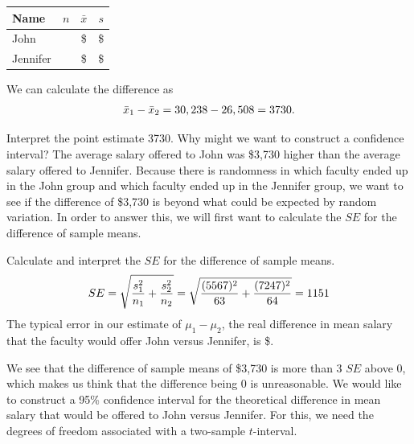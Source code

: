 \begin{center}
\begin{tabular}{l ccc}
\hline
Name\hspace{2mm}	& $n$	& $\bar{x}$	& $s$	\\
\hline 
John		& \johnn{}		& 		 \$\johnmean{} 	& \$\johnsd{}		 \\
Jennifer		& \jennifern{}		& \$\jennifermean{}		& \$\jennifersd{}		 \\
\hline
\end{tabular}
\end{center}
\label{summaryStatsForJohnJenniferStudy}
We can calculate the difference as 
\begin{align*}
 \bar{x}_1-\bar{x}_2 = 30,238{} - 26,508{} = 3730.
\end{align*}

\begin{examplewrap}
\begin{nexample}
{Interpret the point estimate 3730.  Why might we want to construct a confidence interval?}
The average salary offered to John was \$3,730 higher than the average salary offered to Jennifer.  Because there is randomness in which faculty ended up in the John group and which faculty ended up in the Jennifer group, we want to see if the difference of \$3,730 is beyond what could be expected by random variation.  In order to answer this, we will first want to calculate the $SE$ for the difference of sample means.
\end{nexample}
\end{examplewrap}

\begin{examplewrap}
\begin{nexample}
{Calculate and interpret the $SE$ for the difference of sample means.}
\begin{align*}
SE = \sqrt{\frac{s_{1}^2}{n_{1}} + \frac{s_{2}^2}{n_{2}}} = \sqrt{\frac{(5567{})^2}{63{}} + \frac{(7247{})^2}{64{}}} = 1151{}
\end{align*}
The typical error in our estimate of $\mu_1-\mu_2$, the real difference in mean salary that the faculty would offer John versus Jennifer, is \$\johnjenniferSE{}.
\end{nexample}
\end{examplewrap}

\D{\newpage}

We see that the difference of sample means of \$3,730 is more than 3 $SE$ above 0, which makes us think that the difference being 0 is unreasonable.  We would like to construct a 95\% confidence interval for the theoretical difference in mean salary that would be offered to John versus Jennifer.  For this, we need the degrees of freedom associated with a two-sample $t$-interval.  

